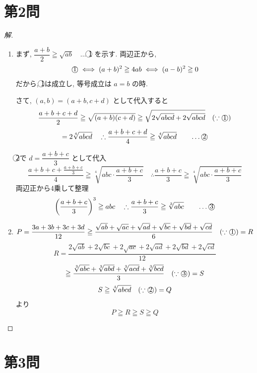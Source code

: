 \documentclass[../main.tex]{subfiles}
\begin{document}
\section*{第2問}

\begin{proof}[解]
  \begin{enumerate}
    \item[(1)] まず, $\dfrac{a+b}{2} \geqq \sqrt{ab} \quad \dots$ \textcircled{1} を示す. 両辺正から,
      \[
        \text{\textcircled{1}} \iff (a+b)^2 \geqq 4ab \iff (a-b)^2 \geqq 0
      \]
      だから, \textcircled{1}は成立し, 等号成立は $a=b$ の時.

      さて, $(a,b) = (a+b, c+d)$ として代入すると
      \[
        \dfrac{a+b+c+d}{2} \geqq \sqrt{(a+b)(c+d)} \geqq \sqrt{2\sqrt{abcd} + 2\sqrt{abcd}} \quad (\because \text{\textcircled{1}})
      \]
      \[
        = 2 \sqrt[4]{abcd} \quad \therefore \dfrac{a+b+c+d}{4} \geqq \sqrt[4]{abcd} \qquad \dots \text{\textcircled{2}}
      \]

      \textcircled{2}で $d = \dfrac{a+b+c}{3}$ として代入
      \[
        \dfrac{a+b+c+\frac{a+b+c}{3}}{4} \geqq \sqrt[4]{abc \cdot \frac{a+b+c}{3}} \quad \therefore \dfrac{a+b+c}{3} \geqq \sqrt[4]{abc \cdot \frac{a+b+c}{3}}
      \]
      両辺正から4乗して整理
      \[
        \left(\dfrac{a+b+c}{3}\right)^3 \geqq abc \quad \therefore \dfrac{a+b+c}{3} \geqq \sqrt[3]{abc} \qquad \dots \text{\textcircled{3}}
      \]

    \item[(2)]
      \[
        P = \dfrac{3a+3b+3c+3d}{12} \geqq \dfrac{\sqrt{ab} + \sqrt{ac} + \sqrt{ad} + \sqrt{bc} + \sqrt{bd} + \sqrt{cd}}{6} \quad (\because \text{\textcircled{1}}) = R
      \]
      \[
        R = \dfrac{2\sqrt{ab} + 2\sqrt{bc} + 2\sqrt{ac} + 2\sqrt{ad} + 2\sqrt{bd} + 2\sqrt{cd}}{12}
      \]
      \[
        \geqq \dfrac{\sqrt[3]{abc} + \sqrt[3]{abd} + \sqrt[3]{acd} + \sqrt[3]{bcd}}{3} \quad (\because \text{\textcircled{3}}) = S
      \]
      \[
        S \geqq \sqrt[4]{abcd} \quad (\because \text{\textcircled{2}}) = Q
      \]
      より
      \[
        P \geqq R \geqq S \geqq Q
      \]
  \end{enumerate}
\end{proof}

\section*{第3問}
\end{document}
